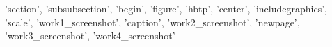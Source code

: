 {'section', 'subsubsection', 'begin', 'figure', 'hbtp', 'center', 'includegraphics', 'scale', 'work1_screenshot', 'caption', 'work2_screenshot', 'newpage', 'work3_screenshot', 'work4_screenshot'}
